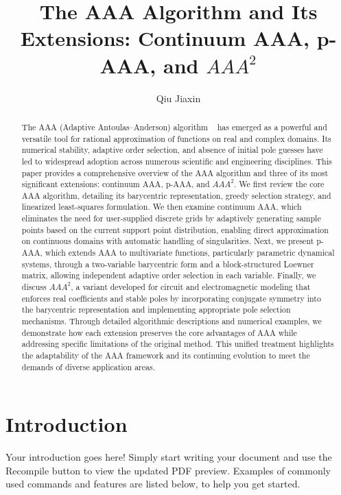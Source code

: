 \documentclass{article}
\title{The AAA Algorithm and Its Extensions: Continuum AAA, p-AAA, and $AAA^{2}$}
\author{Qiu Jiaxin}
\begin{document}
\maketitle

\begin{abstract}
The AAA (Adaptive Antoulas–Anderson) algorithm ~\cite{ref1} has emerged as a powerful and versatile tool for rational approximation of functions on real and complex domains. Its numerical stability, adaptive order selection, and absence of initial pole guesses have led to widespread adoption across numerous scientific and engineering disciplines. This paper provides a comprehensive overview of the AAA algorithm and three of its most significant extensions: continuum AAA, p-AAA, and $AAA^{2}$. We first review the core AAA algorithm, detailing its barycentric representation, greedy selection strategy, and linearized least-squares formulation. We then examine continuum AAA, which eliminates the need for user-supplied discrete grids by adaptively generating sample points based on the current support point distribution, enabling direct approximation on continuous domains with automatic handling of singularities. Next, we present p-AAA, which extends AAA to multivariate functions, particularly parametric dynamical systems, through a two-variable barycentric form and a block-structured Loewner matrix, allowing independent adaptive order selection in each variable. Finally, we discuss $AAA^{2}$, a variant developed for circuit and electromagnetic modeling that enforces real coefficients and stable poles by incorporating conjugate symmetry into the barycentric representation and implementing appropriate pole selection mechanisms. Through detailed algorithmic descriptions and numerical examples, we demonstrate how each extension preserves the core advantages of AAA while addressing specific limitations of the original method. This unified treatment highlights the adaptability of the AAA framework and its continuing evolution to meet the demands of diverse application areas.
\end{abstract}

\newpage

\tableofcontents

\newpage

\section{Introduction}

Your introduction goes here! Simply start writing your document and use the Recompile button to view the updated PDF preview. Examples of commonly used commands and features are listed below, to help you get started.
\end{document}
